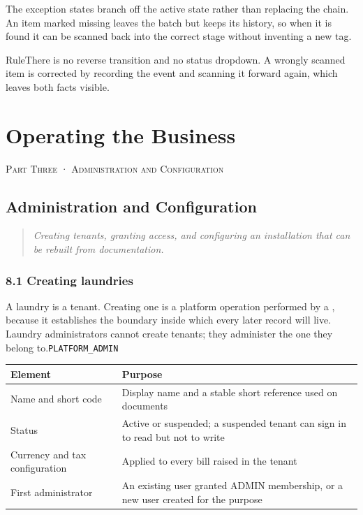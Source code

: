 \documentclass[11pt,a4paper,oneside]{book}
\begin{document}
The exception states branch off the active state rather than replacing the chain. An item marked missing leaves the batch but keeps its history, so when it is found it can be scanned back into the correct stage without inventing a new tag.

\begin{notebox}RuleThere is no reverse transition and no status dropdown. A wrongly scanned item is corrected by recording the event and scanning it forward again, which leaves both facts visible.\end{notebox}
\part{Operating the Business}
\textsc{\small\color{crimson}Part Three · Administration and Configuration}\par\medskip
\chapter{Administration and Configuration}
\begin{quote}\itshape Creating tenants, granting access, and configuring an installation that can be rebuilt from documentation.\end{quote}
\section{8.1 Creating laundries}
A laundry is a tenant. Creating one is a platform operation performed by a , because it establishes the boundary inside which every later record will live. Laundry administrators cannot create tenants; they administer the one they belong to.\texttt{PLATFORM\_ADMIN}

\begin{center}\small
\begin{tabularx}{\linewidth}{|X|X|}
\hline
\rowcolor{lightgrey}
\textbf{Element} & \textbf{Purpose} \\ \hline
Name and short code & Display name and a stable short reference used on documents \\ \hline
Status & Active or suspended; a suspended tenant can sign in to read but not to write \\ \hline
Currency and tax configuration & Applied to every bill raised in the tenant \\ \hline
First administrator & An existing user granted ADMIN membership, or a new user created for the purpose \\ \hline
\end{tabularx}
\end{center}
\end{document}
